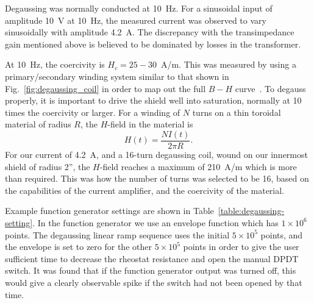 Degaussing was normally conducted at 10~Hz.  For a sinusoidal input of
amplitude 10~V at 10~Hz, the measured current was observed to vary
sinusoidally with amplitude 4.2~A.  The discrepancy with the
transimpedance gain mentioned above is believed to be dominated by
losses in the transformer.

At 10~Hz, the coercivity is $H_c=25-30$~A/m.  This was measured by using
a primary/secondary winding system similar to that shown in
Fig.~\ref{fig:degaussing_coil} in order to map out the full $B-H$
curve~\cite{bib:henri-week-10}.  To degauss properly, it is
important to drive the shield well into saturation, normally at 10
times the coercivity or larger.  For a winding of $N$ turns on a thin
toroidal material of radius $R$, the $H$-field in the material
is~\cite{bib:taraneh-paper}
\begin{equation}
H(t)=\frac{NI(t)}{2\pi R}.
\end{equation}
For our current of 4.2~A, and a 16-turn degaussing coil, wound on our
innermost shield of radius 2'', the $H$-field reaches a maximum of
210~A/m which is more than required.  This was how the number of turns
was selected to be 16, based on the capabilities of the current
amplifier, and the coercivity of the material.

Example function generator settings are shown in
Table~\ref{table:degaussing-setting}.  In the function generator we
use an envelope function which has $1\times 10^6$ points. The
degaussing linear ramp sequence uses the initial $5\times 10^5$
points, and the envelope is set to zero for the other $5\times 10^5$
points in order to give the user sufficient time to decrease the
rheostat resistance and open the manual DPDT switch.  It was found
that if the function generator output was turned off, this would give
a clearly observable spike if the switch had not been opened by that
time.


